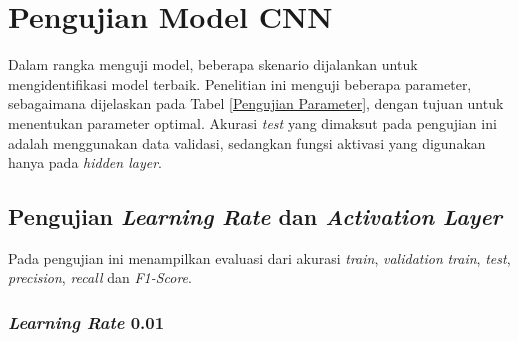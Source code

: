 \section{Pengujian Model CNN}

    Dalam rangka menguji model, beberapa skenario dijalankan untuk mengidentifikasi model terbaik. Penelitian ini menguji beberapa parameter, sebagaimana dijelaskan pada Tabel \ref{Pengujian Parameter}, dengan tujuan untuk menentukan parameter optimal.  Akurasi \textit{test} yang dimaksut pada pengujian ini adalah menggunakan data validasi, sedangkan fungsi aktivasi yang digunakan hanya pada \textit{hidden layer}.


    
        
\subsection{Pengujian \textit{Learning Rate} dan \textit{Activation Layer}}

    Pada pengujian ini menampilkan evaluasi dari akurasi \textit{train}, \textit{validation} \textit{train}, \textit{test}, \textit{precision}, \textit{recall} dan \textit{F1-Score}.

\subsubsection{\textit{Learning Rate} 0.01}

